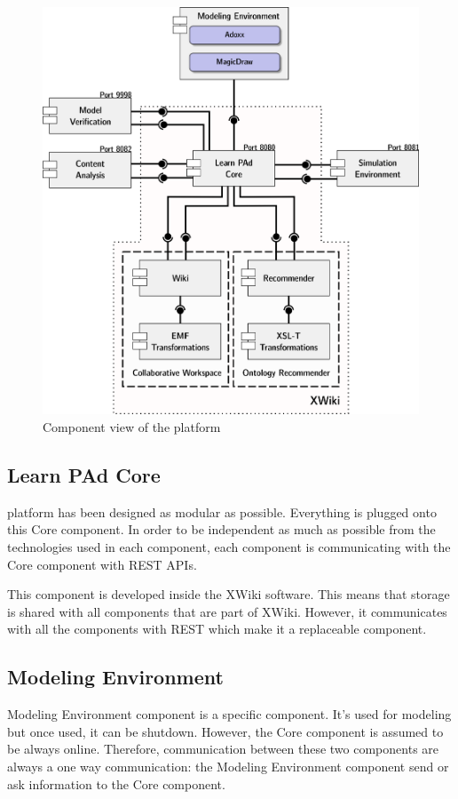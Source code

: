 \documentclass{learnpad}
\begin{document}
\begin{figure}[!htp]
	\centering
	\includegraphics[width=.6\paperwidth,keepaspectratio]{figures/component-view.png}
	\caption{Component view of the \learnpad platform}
	\label{fig:component-view}
\end{figure}

\subsection{Learn PAd Core}
\learnpad platform has been designed as modular as possible.  Everything is
plugged onto this \learnpad Core component.  In order to be independent as much
as possible from the technologies used in each component, each component is
communicating with the \learnpad Core component with REST APIs.

This component is developed inside the XWiki software.  This means that storage
is shared with all components that are part of XWiki.  However, it communicates
with all the components with REST which make it a replaceable component.

\subsection{Modeling Environment}
Modeling Environment component is a specific component.  It's used for modeling
but once used, it can be shutdown.  However, the \learnpad Core component is
assumed to be always online.  Therefore, communication between these two
components are always a one way communication: the Modeling Environment
component send or ask information to the \learnpad Core component.
\end{document}
